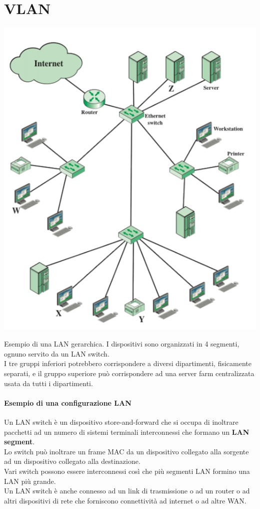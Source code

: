 \documentclass[10pt]{article}
\begin{document}
\section{VLAN}
\begin{multicols}{2}
	\begin{center}
		\includegraphics[scale=0.65]{vlanesempio.png}
	\end{center}
		Esempio di una LAN gerarchica. I dispositivi sono organizzati in 4 segmenti, ognuno servito da un LAN switch.\\
		I tre gruppi inferiori potrebbero corrispondere a diversi dipartimenti, fisicamente separati, e il gruppo superiore può corrispondere ad una server farm centralizzata usata da tutti i dipartimenti.
	\columnbreak
	\paragraph{Esempio di una configurazione LAN} Un LAN switch è un dispositivo store-and-forward che si occupa di inoltrare pacchetti ad un numero di sistemi terminali interconnessi che formano un \textbf{LAN segment}.\\
	Lo switch può inoltrare un frame MAC da un dispositivo collegato alla sorgente ad un dispositivo collegato alla destinazione.\\
	Vari switch possono essere interconnessi così che più segmenti LAN formino una LAN più grande.\\
	Un LAN switch è anche connesso ad un link di trasmissione o ad un router o ad altri dispositivi di rete che forniscono connettività ad internet o ad altre WAN.

\end{multicols}
\end{document}
